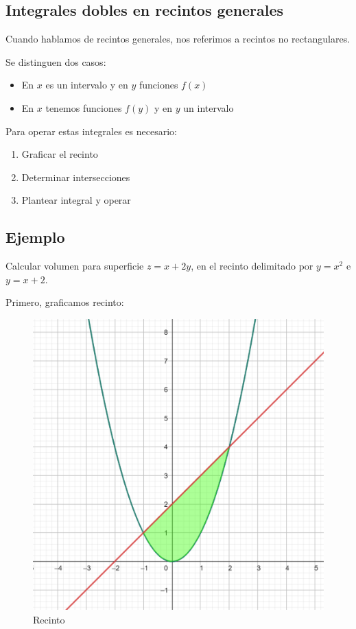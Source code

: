 \subsection{Integrales dobles en recintos generales}

Cuando hablamos de recintos generales,
nos referimos a recintos no rectangulares.

Se distinguen dos casos: 
\begin{itemize}
    \item En \(x\) es un intervalo y en \(y\) funciones \(f(x)\)
    \item En \(x\) tenemos funciones \(f(y)\) y en \(y\) un intervalo
\end{itemize}

Para operar estas integrales es necesario:

\begin{enumerate}
    \item Graficar el recinto
    \item Determinar intersecciones 
    \item Plantear integral y operar
\end{enumerate}

\subsection{Ejemplo}

Calcular volumen para superficie \(z = x + 2y\),
en el recinto delimitado por \(y = x^{2}\) e \(y = x + 2\).

Primero,
graficamos recinto:

\begin{figure}[H]
    \centering
    \includegraphics[scale=.9]{./img/01.png}
    \caption{Recinto}
\end{figure}

